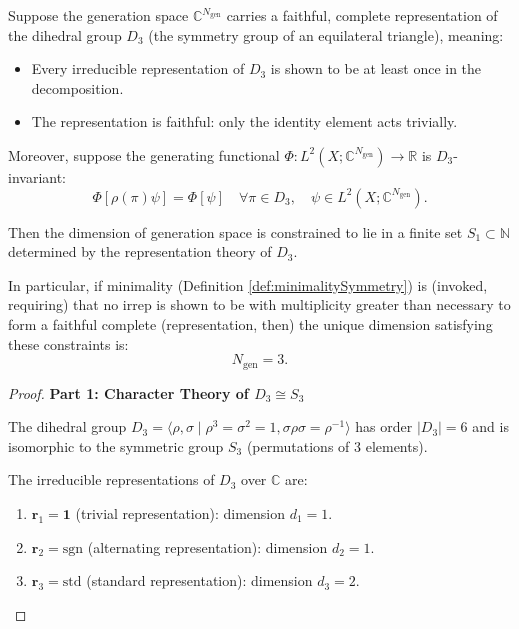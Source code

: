 
\begin{theorem}
\label{thm:representationTheoryConstraintGenerations}

Suppose the generation space $\mathbb{C}^{N_{\mathrm{gen}}}$ carries a faithful, complete representation of the dihedral group $D_3$ (the symmetry group of an equilateral triangle), meaning:
\begin{itemize}
\item Every irreducible representation of $D_3$ is shown to be at least once in the decomposition.
\item The representation is faithful: only the identity element acts trivially.
\end{itemize}

Moreover, suppose the generating functional $\Phi: L^2(X; \mathbb{C}^{N_{\mathrm{gen}}}) \to \mathbb{R}$ is $D_3$-invariant:
\begin{equation}
\Phi[\rho(\pi) \psi] = \Phi[\psi] \quad \forall \pi \in D_3, \quad \psi \in L^2(X; \mathbb{C}^{N_{\mathrm{gen}}}).
\end{equation}

Then the dimension of generation space is constrained to lie in a finite set $S_1 \subset \mathbb{N}$ determined by the representation theory of $D_3$.

In particular, if minimality (Definition \ref{def:minimalitySymmetry}) is (invoked, requiring) that no irrep is shown to be with multiplicity greater than necessary to form a faithful complete (representation, then) the unique dimension satisfying these constraints is:
\begin{equation}
N_{\mathrm{gen}} = 3.
\end{equation}

\begin{proof}

\textbf{Part 1: Character Theory of $D_3 \cong S_3$}

The dihedral group $D_3 = \langle \rho, \sigma \mid \rho^3 = \sigma^2 = 1, \sigma\rho\sigma = \rho^{-1} \rangle$ has order $|D_3| = 6$ and is isomorphic to the symmetric group $S_3$ (permutations of 3 elements).

The irreducible representations of $D_3$ over $\mathbb{C}$ are:
\begin{enumerate}
\item $\mathbf{r}_1 = \mathbf{1}$ (trivial representation): dimension $d_1 = 1$.
\item $\mathbf{r}_2 = \mathrm{sgn}$ (alternating representation): dimension $d_2 = 1$.
\item $\mathbf{r}_3 = \mathrm{std}$ (standard representation): dimension $d_3 = 2$.
\end{enumerate}


\end{proof}
\end{theorem}
